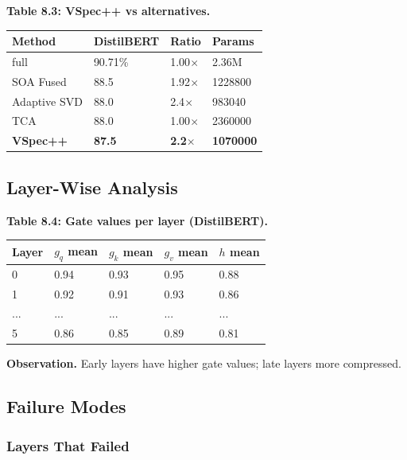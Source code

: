 \textbf{Table 8.3: VSpec++ vs alternatives.}

\begin{table}[H]
\centering
\small
\begin{tabular}{llll}
\toprule
\textbf{Method} & \textbf{DistilBERT} & \textbf{Ratio} & \textbf{Params} \\
\midrule
full & 90.71\% & 1.00$\times$ & 2.36M \\
SOA Fused & 88.5 & 1.92$\times$ & 1228800 \\
Adaptive SVD & 88.0 & 2.4$\times$ & 983040 \\
TCA & 88.0 & 1.00$\times$ & 2360000 \\
\textbf{VSpec++} & \textbf{87.5} & \textbf{2.2$\times$} & \textbf{1070000} \\
\bottomrule
\end{tabular}
\end{table}

\subsection{Layer-Wise Analysis}

\textbf{Table 8.4: Gate values per layer (DistilBERT).}

\begin{table}[H]
\centering
\small
\begin{tabular}{lllll}
\toprule
\textbf{Layer} & \textbf{$g_q$ mean} & \textbf{$g_k$ mean} & \textbf{$g_v$ mean} & \textbf{$h$ mean} \\
\midrule
0 & 0.94 & 0.93 & 0.95 & 0.88 \\
1 & 0.92 & 0.91 & 0.93 & 0.86 \\
... & ... & ... & ... & ... \\
5 & 0.86 & 0.85 & 0.89 & 0.81 \\
\bottomrule
\end{tabular}
\end{table}

\textbf{Observation.} Early layers have higher gate values; late layers more compressed.

\subsection{Failure Modes}

\subsubsection{Layers That Failed}

